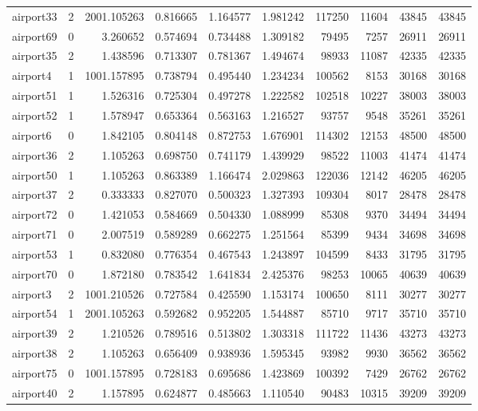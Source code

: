 \documentclass[../../../thesis.tex]{subfiles}
\begin{document}
\begin{longtable}{|l|r|r|r|r|r|r|r|r|r|}
airport33 & 2 & 2001.105263 & 0.816665 & 1.164577 & 1.981242 & 117250 & 11604 & 43845 & 43845 \\
airport69 & 0 & 3.260652 & 0.574694 & 0.734488 & 1.309182 & 79495 & 7257 & 26911 & 26911 \\
airport35 & 2 & 1.438596 & 0.713307 & 0.781367 & 1.494674 & 98933 & 11087 & 42335 & 42335 \\
airport4 & 1 & 1001.157895 & 0.738794 & 0.495440 & 1.234234 & 100562 & 8153 & 30168 & 30168 \\
airport51 & 1 & 1.526316 & 0.725304 & 0.497278 & 1.222582 & 102518 & 10227 & 38003 & 38003 \\
airport52 & 1 & 1.578947 & 0.653364 & 0.563163 & 1.216527 & 93757 & 9548 & 35261 & 35261 \\
airport6 & 0 & 1.842105 & 0.804148 & 0.872753 & 1.676901 & 114302 & 12153 & 48500 & 48500 \\
airport36 & 2 & 1.105263 & 0.698750 & 0.741179 & 1.439929 & 98522 & 11003 & 41474 & 41474 \\
airport50 & 1 & 1.105263 & 0.863389 & 1.166474 & 2.029863 & 122036 & 12142 & 46205 & 46205 \\
airport37 & 2 & 0.333333 & 0.827070 & 0.500323 & 1.327393 & 109304 & 8017 & 28478 & 28478 \\
airport72 & 0 & 1.421053 & 0.584669 & 0.504330 & 1.088999 & 85308 & 9370 & 34494 & 34494 \\
airport71 & 0 & 2.007519 & 0.589289 & 0.662275 & 1.251564 & 85399 & 9434 & 34698 & 34698 \\
airport53 & 1 & 0.832080 & 0.776354 & 0.467543 & 1.243897 & 104599 & 8433 & 31795 & 31795 \\
airport70 & 0 & 1.872180 & 0.783542 & 1.641834 & 2.425376 & 98253 & 10065 & 40639 & 40639 \\
airport3 & 2 & 1001.210526 & 0.727584 & 0.425590 & 1.153174 & 100650 & 8111 & 30277 & 30277 \\
airport54 & 1 & 2001.105263 & 0.592682 & 0.952205 & 1.544887 & 85710 & 9717 & 35710 & 35710 \\
airport39 & 2 & 1.210526 & 0.789516 & 0.513802 & 1.303318 & 111722 & 11436 & 43273 & 43273 \\
airport38 & 2 & 1.105263 & 0.656409 & 0.938936 & 1.595345 & 93982 & 9930 & 36562 & 36562 \\
airport75 & 0 & 1001.157895 & 0.728183 & 0.695686 & 1.423869 & 100392 & 7429 & 26762 & 26762 \\
airport40 & 2 & 1.157895 & 0.624877 & 0.485663 & 1.110540 & 90483 & 10315 & 39209 & 39209 \\

\end{longtable}
\end{document}
